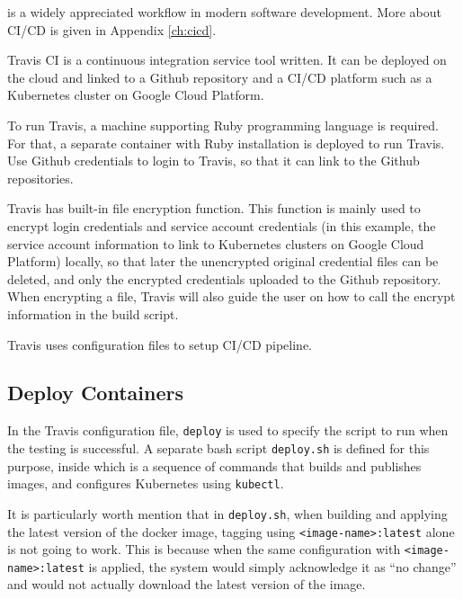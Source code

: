 is a widely appreciated workflow in modern software development. More about CI/CD is given in Appendix \ref{ch:cicd}.

Travis CI is a continuous integration service tool written. It can be deployed on the cloud and linked to a Github repository and a CI/CD platform such as a Kubernetes cluster on Google Cloud Platform.

To run Travis, a machine supporting Ruby programming language is required. For that, a separate container with Ruby installation is deployed to run Travis. Use Github credentials to login to Travis, so that it can link to the Github repositories.

Travis has built-in file encryption function. This function is mainly used to encrypt login credentials and service account credentials (in this example, the service account information to link to Kubernetes clusters on Google Cloud Platform) locally, so that later the unencrypted original credential files can be deleted, and only the encrypted credentials uploaded to the Github repository. When encrypting a file, Travis will also guide the user on how to call the encrypt information in the build script.

Travis uses configuration files to setup CI/CD pipeline.

\subsection{Deploy Containers}

In the Travis configuration file, \verb|deploy| is used to specify the script to run when the testing is successful. A separate bash script \verb|deploy.sh| is defined for this purpose, inside which is a sequence of commands that builds and publishes images, and configures Kubernetes using \verb|kubectl|.

It is particularly worth mention that in \verb|deploy.sh|, when building and applying the latest version of the docker image, tagging using \verb|<image-name>:latest| alone is not going to work. This is because when the same configuration with \verb|<image-name>:latest| is applied, the system would simply acknowledge it as ``no change'' and would not actually download the latest version of the image.


